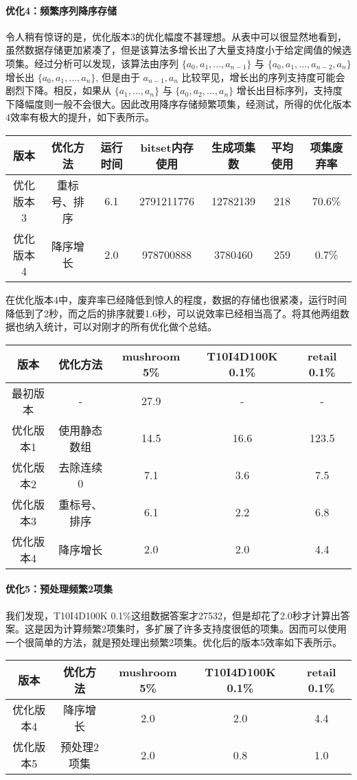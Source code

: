 \documentclass[a4paper,9pt]{article}
\begin{document}
\paragraph{优化4：频繁序列降序存储}
令人稍有惊讶的是，优化版本3的优化幅度不甚理想。从表中可以很显然地看到，虽然数据存储更加紧凑了，但是该算法多增长出了大量支持度小于给定阈值的候选项集。经过分析可以发现，该算法由序列 $\{a_0,a_1,...,a_{n-1}\}$ 与 $\{a_0,a_1,...,a_{n-2},a_n\}$ 增长出 $\{a_0,a_1,...,a_n\}$, 但是由于 $a_{n-1},a_n$ 比较罕见，增长出的序列支持度可能会剧烈下降。相反，如果从 $\{a_1,...,a_n\}$ 与 $\{a_0,a_2,...,a_n\}$ 增长出目标序列，支持度下降幅度则一般不会很大。因此改用降序存储频繁项集，经测试，所得的优化版本4效率有极大的提升，如下表所示。
\begin{center}
	\begin{tabular}{ccccccc}
		版本&优化方法&运行时间&bitset内存使用&生成项集数&平均使用&项集废弃率\\\hline
		优化版本3&重标号、排序&6.1&2791211776&12782139&218&70.6\%\\
		优化版本4&降序增长&2.0&978700888&3780460&259&0.7\%
	\end{tabular}
\end{center}
在优化版本4中，废弃率已经降低到惊人的程度，数据的存储也很紧凑，运行时间降低到了2秒，而之后的排序就要1.6秒，可以说效率已经相当高了。将其他两组数据也纳入统计，可以对刚才的所有优化做个总结。
\begin{center}
	\begin{tabular}{ccccc}
		版本&优化方法&mushroom 5\%&T10I4D100K 0.1\%&retail 0.1\%\\\hline
		最初版本&-&27.9&-&-\\
		优化版本1&使用静态数组&14.5&16.6&123.5\\
		优化版本2&去除连续0&7.1&3.6&7.5\\
		优化版本3&重标号、排序&6.1&2.2&6.8\\
		优化版本4&降序增长&2.0&2.0&4.4
	\end{tabular}
\end{center}

\paragraph{优化5：预处理频繁2项集} 我们发现，T10I4D100K 0.1\%这组数据答案才27532，但是却花了2.0秒才计算出答案。这是因为计算频繁2项集时，多扩展了许多支持度很低的项集。因而可以使用一个很简单的方法，就是预处理出频繁2项集。优化后的版本5效率如下表所示。
\begin{center}
	\begin{tabular}{ccccc}
		版本&优化方法&mushroom 5\%&T10I4D100K 0.1\%&retail 0.1\%\\\hline
		优化版本4&降序增长&2.0&2.0&4.4\\
		优化版本5&预处理2项集&2.0&0.8&1.0
	\end{tabular}
\end{center}
\end{document}
